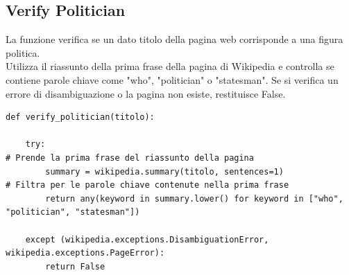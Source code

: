 \documentclass{article}
\begin{document}
		\subsection{Verify Politician}
La funzione verifica se un dato titolo della pagina web corrisponde a una figura politica. \\ Utilizza il riassunto della prima frase della pagina di Wikipedia e controlla se contiene parole chiave come "who", "politician" o "statesman". Se si verifica un errore di disambiguazione o la pagina non esiste, restituisce False.
		\begin{lstlisting}
def verify_politician(titolo):

	try:
# Prende la prima frase del riassunto della pagina
		summary = wikipedia.summary(titolo, sentences=1)
# Filtra per le parole chiave contenute nella prima frase
		return any(keyword in summary.lower() for keyword in ["who", "politician", "statesman"])

	except (wikipedia.exceptions.DisambiguationError, wikipedia.exceptions.PageError):
		return False
		\end{lstlisting}
		
\end{document}
